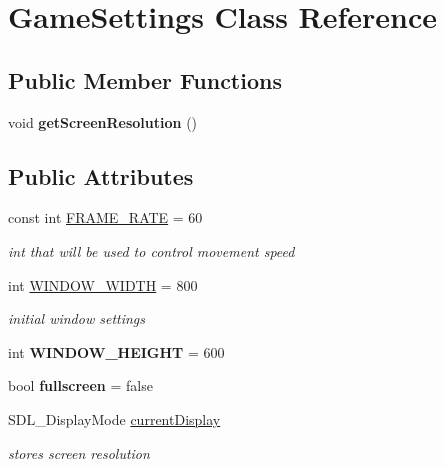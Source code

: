 \hypertarget{class_game_settings}{}\section{Game\+Settings Class Reference}
\label{class_game_settings}
\subsection*{Public Member Functions}
\begin{DoxyCompactItemize}
\item 
\mbox{\label{class_game_settings_a0021dbf029d3928a6b136fdc5df25e59}} 
void {\bfseries get\+Screen\+Resolution} ()
\end{DoxyCompactItemize}
\subsection*{Public Attributes}
\begin{DoxyCompactItemize}
\item 
\mbox{\label{class_game_settings_a08bd6d169f42dac744c792bfc4c2118e}} 
const int \hyperlink{class_game_settings_a08bd6d169f42dac744c792bfc4c2118e}{F\+R\+A\+M\+E\+\_\+\+R\+A\+TE} = 60
\begin{DoxyCompactList}\small\item\em int that will be used to control movement speed \end{DoxyCompactList}\item 
\mbox{\label{class_game_settings_ad7ab595cc408853b20ac98b064fd9272}} 
int \hyperlink{class_game_settings_ad7ab595cc408853b20ac98b064fd9272}{W\+I\+N\+D\+O\+W\+\_\+\+W\+I\+D\+TH} = 800
\begin{DoxyCompactList}\small\item\em initial window settings \end{DoxyCompactList}\item 
\mbox{\label{class_game_settings_a87eb5f9c3d55aabe1780871b0005cbf9}} 
int {\bfseries W\+I\+N\+D\+O\+W\+\_\+\+H\+E\+I\+G\+HT} = 600
\item 
\mbox{\label{class_game_settings_ac38e368e94d990cde54d8b0c0dca65de}} 
bool {\bfseries fullscreen} = false
\item 
\mbox{\label{class_game_settings_a71c452d4138b06276d7825047a654bc0}} 
S\+D\+L\+\_\+\+Display\+Mode \hyperlink{class_game_settings_a71c452d4138b06276d7825047a654bc0}{current\+Display}
\begin{DoxyCompactList}\small\item\em stores screen resolution \end{DoxyCompactList}\end{DoxyCompactItemize}


